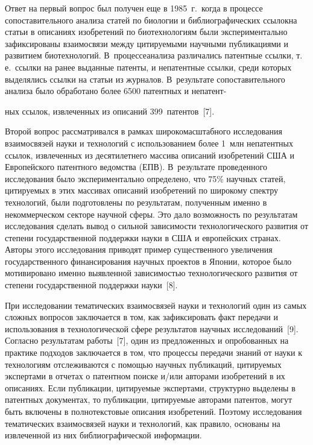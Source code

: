 \begin{multicols}{2}
      Ответ на первый вопрос был получен еще в 1985~г.\, когда в процессе 
сопоставительного ана\-ли\-за статей по биологии и библиографических \mbox{ссылок}\linebreak на статьи в 
описаниях изобретений по биотехнологиям были экспериментально зафиксированы 
взаимосвязи между цитируемыми научными публикациями и развитием биотехнологий. 
В~процессе\linebreak анализа различались патентные ссылки, т.\,е.\ ссылки на ранее выданные патенты, 
и непатентные ссылки, среди которых выделялись ссылки на статьи из журналов. В~результате 
сопоставительного анализа было обработано более 6500 патентных и непатент-\linebreak\vspace*{-12pt}

\pagebreak

\noindent
ных ссылок, 
извлеченных из описаний 399~патентов~[7].

    
    Второй вопрос рассматривался в рамках широкомасштабного исследования взаимосвязей 
науки и технологий с использованием более 1~млн непатентных ссылок, 
извлеченных из десятилетнего массива описаний изобретений США и Европейского патентного 
ведомства (ЕПВ). В~результате проведенного исследования было экспериментально 
определено, что 75\% научных статей, цитируемых в этих массивах описаний изобретений по 
широкому спектру технологий, были подготовлены по результатам, полученным именно в 
некоммерческом секторе научной сферы. Это дало возможность по результатам исследования 
сделать вывод о сильной зависимости технологического развития от степени государственной 
поддержки науки в США и европейских странах. Авторы этого исследования приводят пример 
существенного увеличения государственного финансирования научных проектов в Японии, 
которое было мотивировано именно выявленной зависимостью технологического развития от 
степени государственной поддержки науки~[8].
    
    При исследовании тематических взаимосвязей науки и технологий один из самых сложных 
вопросов заключается в том, как зафиксировать факт передачи и использования в 
технологической сфере результатов научных исследований~[9]. Согласно результатам 
работы~[7], один из предложенных и опробованных на практике подходов заключается в том, 
что процессы передачи знаний от науки к технологиям отслеживаются с помощью научных 
публикаций, цитируемых экспертами в отчетах о патентном поиске и/или авторами 
изобретений в их описаниях. Если публикации, цитируемые экспертами, структурно выделены 
в патентных документах, то публикации, цитируемые авторами патентов, могут быть включены 
в полнотекстовые описания изобретений. Поэтому исследования тематических взаимосвязей 
науки и технологий, как правило, основаны на извлеченной из них библиографической 
информации.
    

\end{multicols}
